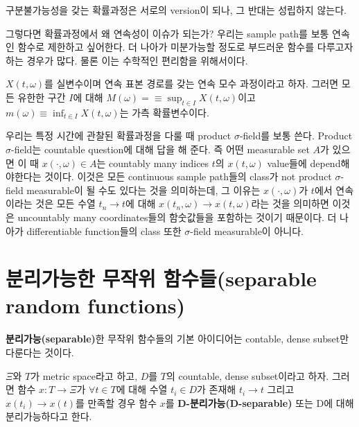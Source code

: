 \documentclass[b5paper,]{scrbook}
\theoremstyle{plain}
\theoremstyle{definition}
\numberwithin{equation}{section}
\let\BeginKnitrBlock\begin \let\EndKnitrBlock\end
\begin{document}
구분불가능성을 갖는 확률과정은 서로의 version이 되나, 그 반대는 성립하지 않는다.

그렇다면 확률과정에서 왜 연속성이 이슈가 되는가? 우리는 sample path를 보통 연속인 함수로 제한하고 싶어한다. 더 나아가 미분가능할 정도로 부드러운 함수를 다루고자 하는 경우가 많다. 물론 이는 수학적인 편리함을 위해서이다.

\BeginKnitrBlock{proposition}
\protect\hypertarget{prp:unnamed-chunk-144}{}{\label{prp:unnamed-chunk-144} }\(X(t,\omega)\)를 실변수이며 연속 표본 경로를 갖는 연속 모수 과정이라고 하자. 그러면 모든 유한한 구간 \(I\)에 대해 \(M(\omega)=\equiv \sup_{t\in I}X(t,\omega)\)이고 \(m(\omega)\equiv \inf_{t\in I}X(t,\omega)\)는 가측 확률변수이다.
\EndKnitrBlock{proposition}

우리는 특정 시간에 관찰된 확률과정을 다룰 때 product \(\sigma\)-field를 보통 쓴다. Product \(\sigma\)-field는 countable question에 대해 답을 해 준다. 즉 어떤 measurable set \(A\)가 있으면 이 때 \(x(\cdot, \omega)\in A\)는 countably many indices \(t\)의 \(x(t,\omega)\) value들에 depend해야한다는 것이다. 이것은 모든 continuous sample path들의 class가 not product \(\sigma\)-field measurable이 될 수도 있다는 것을 의미하는데, 그 이유는 \(x(\cdot, \omega)\)가 \(t\)에서 연속이라는 것은 모든 수열 \(t_{n}\rightarrow t\)에 대해 \(x(t_{n},\omega)\rightarrow x(t,\omega)\)라는 것을 의미하면 이것은 uncountably many coordinates들의 함숫값들을 포함하는 것이기 때문이다. 더 나아가 differentiable function들의 class 또한 \(\sigma\)-field measurable이 아니다.

\hypertarget{--separable-random-functions}{%
\section{분리가능한 무작위 함수들(separable random functions)}\label{--separable-random-functions}}

\textbf{분리가능(separable)}한 무작위 함수들의 기본 아이디어는 contable, dense subset만 다룬다는 것이다.

\BeginKnitrBlock{definition}[분리가능 함수들(separable functions]
\protect\hypertarget{def:unnamed-chunk-145}{}{\label{def:unnamed-chunk-145} {} }\(\Xi\)와 \(T\)가 metric space라고 하고, \(D\)를 \(T\)의 countable, dense subset이라고 하자. 그러면 함수 \(x: T\rightarrow \Xi\)가 \(\forall t\in T\)에 대해 수열 \(t_{i}\in D\)가 존재해 \(t_{i}\rightarrow t\) 그리고 \(x(t_{i})\rightarrow x(t)\)를 만족할 경우 함수 \(x\)를 \textbf{D-분리가능(D-separable)} 또는 D에 대해 분리가능하다고 한다.
\EndKnitrBlock{definition}
\end{document}
